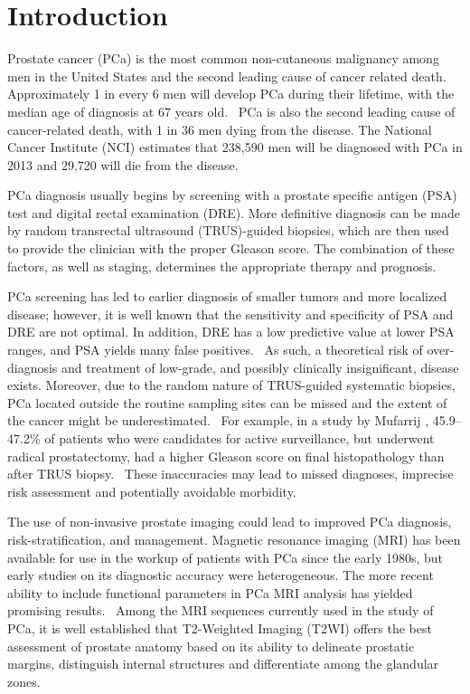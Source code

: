 \section{Introduction}\label{sect:intro}
Prostate cancer (PCa) is the most common non-cutaneous malignancy among men in
the United States and the second leading cause of cancer related
death.~\cite{Howlader2011} Approximately 1 in every 6 men will develop PCa
during their lifetime, with the median age of diagnosis at 67 years
old.~\cite{Howlader2011} PCa is also the second leading cause of cancer-related
death, with 1 in 36 men dying from the disease.  The National Cancer Institute
(NCI) estimates that 238,590 men will be diagnosed with PCa in 2013 and 29,720
will die from the disease.~\cite{Howlader2011}

PCa diagnosis usually begins by screening with a prostate specific antigen (PSA)
test and digital rectal examination (DRE).  More definitive diagnosis can be made by
random transrectal ultrasound (TRUS)-guided biopsies, which are then used to
provide the clinician with the proper Gleason score. The combination of these
factors, as well as staging, determines the appropriate therapy and prognosis.

PCa screening has led to earlier diagnosis of smaller tumors and more localized
disease; however, it is well known that the sensitivity and specificity of PSA
and DRE are not optimal. In addition, DRE has a low predictive value at lower
PSA ranges, and PSA yields many false
positives.~\cite{Gosselaar2007,Gupta2013,Hricak2007} As such, a theoretical
risk of over-diagnosis and treatment of low-grade, and possibly clinically
insignificant, disease exists.  Moreover, due to the random nature of
TRUS-guided systematic biopsies, PCa located outside the routine sampling sites
can be missed and the extent of the cancer might be
underestimated.~\cite{Gupta2013,Cornud2012} For example, in a study by Mufarrij
\etal, 45.9--47.2\% of patients who were candidates for active surveillance,
but underwent radical prostatectomy, had a higher Gleason score on final
histopathology than after TRUS biopsy.~\cite{Mufarrij2010} These inaccuracies
may lead to missed diagnoses, imprecise risk assessment and potentially
avoidable morbidity.

The use of non-invasive prostate imaging could lead to improved PCa diagnosis,
risk-stratification, and management.  Magnetic resonance imaging (MRI) has been
available for use in the workup of patients with PCa since the early 1980s, but
early studies on its diagnostic accuracy were heterogeneous.  The more
recent ability to include functional parameters in PCa MRI analysis has yielded
promising results.~\cite{Gupta2013,Hricak2007} Among the MRI sequences
currently used in the study of PCa, it is well established that T2-Weighted
Imaging (T2WI) offers the best assessment of prostate anatomy based on its
ability to delineate prostatic margins, distinguish internal structures and
differentiate among the glandular zones. 

